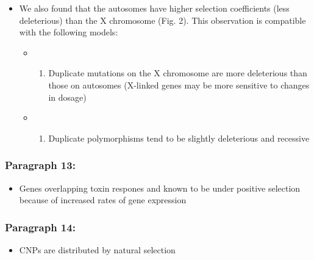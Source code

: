 \documentclass[]{book}
\providecommand{\tightlist}{%
  \setlength{\itemsep}{0pt}\setlength{\parskip}{0pt}}
\begin{document}
\begin{itemize}
\tightlist
\item
  We also found that the autosomes have higher selection coefficients (less deleterious) than the X chromosome (Fig. 2). This observation is compatible with the following models:

  \begin{itemize}
  \item
    \begin{enumerate}
    \def\labelenumi{\arabic{enumi}.}
    \tightlist
    \item
      Duplicate mutations on the X chromosome are more deleterious than those on autosomes (X-linked genes may be more sensitive to changes in dosage)\\
    \end{enumerate}
  \item
    \begin{enumerate}
    \def\labelenumi{\arabic{enumi}.}
    \setcounter{enumi}{1}
    \tightlist
    \item
      Duplicate polymorphisms tend to be slightly deleterious and recessive
    \end{enumerate}
  \end{itemize}
\end{itemize}

\hypertarget{paragraph-13}{%
\subsubsection{Paragraph 13:}\label{paragraph-13}}

\begin{itemize}
\tightlist
\item
  Genes overlapping toxin respones and known to be under positive selection because of increased rates of gene expression
\end{itemize}

\hypertarget{paragraph-14}{%
\subsubsection{Paragraph 14:}\label{paragraph-14}}

\begin{itemize}
\tightlist
\item
  CNPs are distributed by natural selection
\end{itemize}


\end{document}

